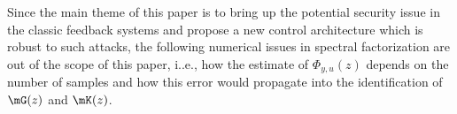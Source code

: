   \begin{remark}
    Since the main theme of this paper is to bring up the potential security issue in the classic feedback systems and propose a new control architecture which is robust to such attacks, the following numerical issues in spectral factorization are out of the scope of this paper, i..e., how the estimate of $\Phi_{y,u}(z)$ depends on the number of samples and how this error would propagate into the identification of $\mG(z)$ and $\mK(z)$. 
  \end{remark}
